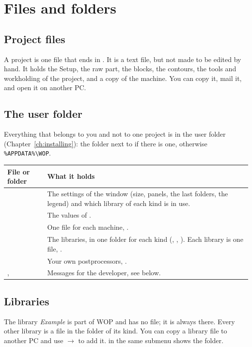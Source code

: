 \chapter{Files and folders}\label{ch:app_files}

\section{Project files}
A project is one file that ends in . It is a text file, but not made to be edited by hand. It holds the Setup, the raw part, the blocks, the contours, the tools and workholding of the project, and a copy of the machine. You can copy it, mail it, and open it on another PC.

\section{The user folder}
Everything that belongs to you and not to one project is in the user folder (Chapter~\ref{ch:installing}): the folder  next to  if there is one, otherwise \texttt{\%APPDATA\%\textbackslash WOP}.

\begin{center}
\begin{tabularx}{\textwidth}{@{}l Y@{}}
\toprule
\textbf{File or folder} & \textbf{What it holds} \\
\midrule
{} & The settings of the window (size, panels, the last folders, the legend) and which library of each kind is in use. \\
 & The values of . \\
 & One file for each machine, . \\
 & The libraries, in one folder for each kind (, , ). Each library is one file, . \\
 & Your own postprocessors, . \\
,  & Messages for the developer, see below. \\
\bottomrule
\end{tabularx}
\end{center}

\section{Libraries}
The library \emph{Example} is part of WOP and has no file; it is always there. Every other library is a file in the folder of its kind. You can copy a library file to another PC and use  $\rightarrow$  to add it.  in the same submenu shows the folder.

